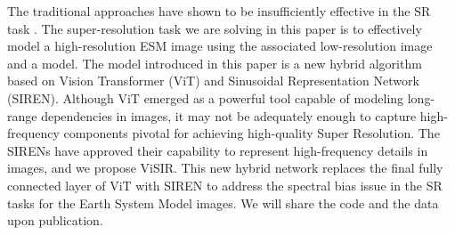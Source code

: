 \documentclass[pdflatex,sn-mathphys-num]{sn-jnl}%
\begin{document}
The traditional approaches have shown to be insufficiently effective in the SR task \cite{ledig2017,tai2017}. The super-resolution task we are solving in this paper is to effectively model a high-resolution ESM image using the associated low-resolution image and a model. The model introduced in this paper is a new hybrid algorithm based on Vision Transformer (ViT) and Sinusoidal Representation Network (SIREN). Although ViT emerged as a powerful tool capable of modeling long-range dependencies in images\cite{touvron2021, Dosovitskiy2020}, it may not be adequately enough to capture high-frequency components pivotal for achieving high-quality Super Resolution\cite{bai2022}. The SIRENs have approved their capability to represent high-frequency details in images\cite{SIREN}, and we propose ViSIR. This new hybrid network replaces the final fully connected layer of ViT with SIREN to address the spectral bias issue in the SR tasks for the Earth System Model images. We will share the code and the data upon publication. 
\end{document}
